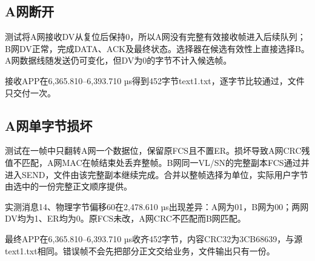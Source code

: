 \subsection{A网断开}

测试将A网接收DV从复位后保持0，所以A网没有完整有效接收帧进入后续队列；B网DV正常，完成DATA、ACK及最终状态。选择器在候选有效性上直接选择B。A网数据线随发送仍可变化，但DV为0的字节不计入候选帧。

接收APP在6,365.810--6,393.710 µs得到452字节text1.txt，逐字节比较通过，文件只交付一次。

\subsection{A网单字节损坏}

测试在一帧中只翻转A网一个数据位，保留原FCS且不置ER。损坏导致A网CRC残值不匹配，A网MAC在帧结束处丢弃整帧。B网同一VL/SN的完整副本FCS通过并进入SEND，文件由该完整副本继续完成。合并以整帧选择为单位，实际用户字节由选中的一份完整正文顺序提供。

实测消息14、物理字节偏移60在2,478.610 µs出现差异：A网为01，B网为00；两网DV均为1、ER均为0。原FCS未改，A网CRC不匹配而B网匹配。

最终APP在6,365.810--6,393.710 µs收齐452字节，内容CRC32为3CB68639，与源text1.txt相同。错误帧不会先把部分正文交给业务，文件输出只有一份。

